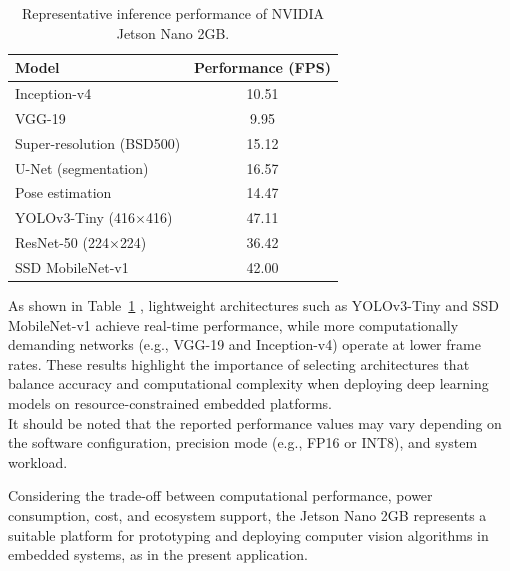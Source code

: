 \begin{table}[h]
\centering
\begin{tabular}{l c}
\hline
\textbf{Model} & \textbf{Performance (FPS)} \\
\hline
Inception-v4 & 10.51 \\
VGG-19 & 9.95 \\
Super-resolution (BSD500) & 15.12 \\
U-Net (segmentation) & 16.57 \\
Pose estimation & 14.47 \\
YOLOv3-Tiny (416$\times$416) & 47.11 \\
ResNet-50 (224$\times$224) & 36.42 \\
SSD MobileNet-v1 & 42.00 \\
\hline
\end{tabular}
\caption{Representative inference performance of NVIDIA Jetson Nano 2GB.}
\label{tab:jetson_benchmarks}
\end{table}

As shown in Table~\ref{tab:jetson_benchmarks} \cite{moe_long_nvidia_nodate}, lightweight architectures such as YOLOv3-Tiny and SSD MobileNet-v1 achieve real-time performance, while more computationally demanding networks (e.g., VGG-19 and Inception-v4) operate at lower frame rates. These results highlight the importance of selecting architectures that balance accuracy and computational complexity when deploying deep learning models on resource-constrained embedded platforms.
\\
It should be noted that the reported performance values may vary depending on the software configuration, precision mode (e.g., FP16 or INT8), and system workload.


Considering the trade-off between computational performance, power consumption, cost, and ecosystem support, the Jetson Nano 2GB represents a suitable platform for prototyping and deploying computer vision algorithms in embedded systems, as in the present application.
\newpage